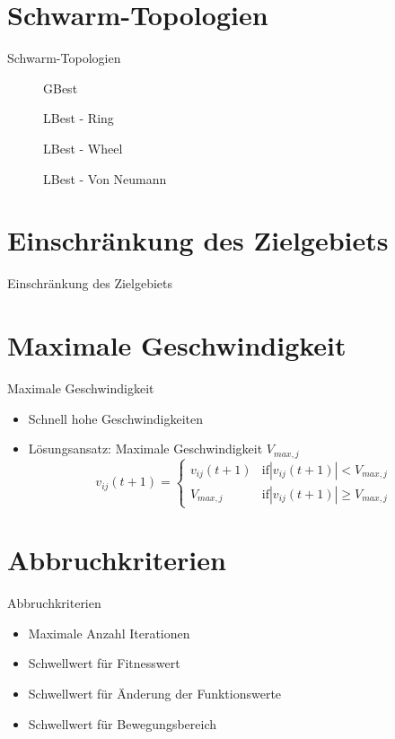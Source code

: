 \section{Schwarm-Topologien}
\begin{frame}{Schwarm-Topologien}
	\begin{figure}[htbp]
		\centering
		\begin{minipage}{4cm}
			\centering
			
			GBest
		\end{minipage}
		\begin{minipage}{4cm}
			\centering
			
			LBest - Ring
		\end{minipage}
		\begin{minipage}{4cm}
			\centering
			
			LBest - Wheel
		\end{minipage}
		\begin{minipage}{4cm}
			\centering
			
			LBest - Von Neumann
		\end{minipage}
	\end{figure}		
\end{frame}

\section[Zielgebiet]{Einschränkung des Zielgebiets}
\begin{frame}{Einschränkung des Zielgebiets}
	
\end{frame}

\section[Geschwindigkeit]{Maximale Geschwindigkeit}
\begin{frame}{Maximale Geschwindigkeit}
	\begin{itemize}
		\item Schnell hohe Geschwindigkeiten
		\item Lösungsansatz: Maximale Geschwindigkeit $V_{max,j}$
			\begin{equation*}
				v_{ij}(t+1) = 
				\begin{cases}
					v_{ij}(t+1) & \text{if} |v_{ij}(t+1)| < V_{max,j} \\
					V_{max,j} & \text{if} |v_{ij}(t+1)| \geq V_{max,j}
				\end{cases}
			\end{equation*} 
	\end{itemize}
\end{frame}

\section[Abbruch-kriterien]{Abbruchkriterien}
\begin{frame}{Abbruchkriterien}
	\begin{itemize}
		\item Maximale Anzahl Iterationen
		\item Schwellwert für Fitnesswert
		\item Schwellwert für Änderung der Funktionswerte
		\item Schwellwert für Bewegungsbereich
	\end{itemize}
\end{frame}